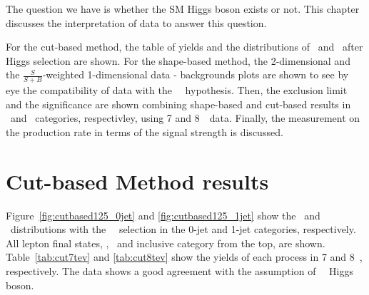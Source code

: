 The question we have is whether the SM Higgs boson exists or not.  
This chapter discusses the interpretation of data to answer this question.

For the cut-based method, the table of yields and the distributions 
of \mT\ and \mll\ after Higgs selection are shown. 
For the shape-based method, the 2-dimensional and the $\frac{S}{S+B}$-weighted 1-dimensional
data - backgrounds plots are shown to see by eye the 
compatibility of data with the ~\GeV\ hypothesis. 
Then, the exclusion limit and the significance are shown combining 
shape-based and cut-based results in \DF\ and \SF\ categories, respectivley, 
using 7 and 8~\TeV\ data. Finally, the measurement on the 
production rate in terms of the signal strength is discussed. 

\section{Cut-based Method results}  

Figure~\ref{fig:cutbased125_0jet} and \ref{fig:cutbased125_1jet} show the
\mT\ and \mll\ distributions with the ~\GeV\ selection 
in the 0-jet and 1-jet categories, respectively. 
All lepton final states, \DF, \SF\ and inclusive category from the top, are shown. 
Table~\ref{tab:cut7tev} and \ref{tab:cut8tev} show the yields of each process 
in 7 and 8~\TeV, respectively.
The data shows a good agreement with the assumption of ~\GeV\ Higgs boson. 

